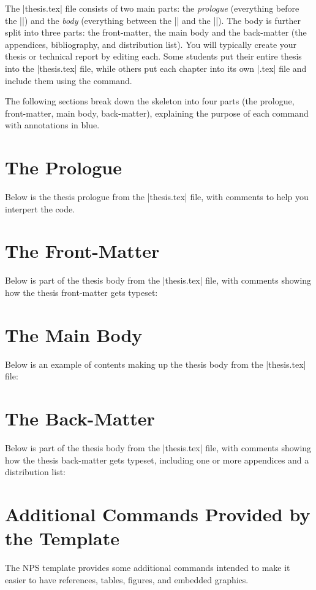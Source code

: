 The |thesis.tex| file consists of two main parts: the
\emph{prologue} (everything before the ||) and the
\emph{body} (everything between the || and the
||). The body is further split into three parts: the front-matter,
the main body and the back-matter (the appendices, bibliography, and
distribution list). You will typically create your thesis or technical
report by editing
each. Some students put their entire thesis into the |thesis.tex|
file, while others put each chapter into its own |.tex| file and
include them using the \verb|| command.

The following sections 
break down the skeleton into four parts (the prologue, front-matter, main body, back-matter), 
explaining the purpose of each command with annotations in blue.


\section{The Prologue}\label{sec:prologue}
Below is the thesis prologue from the |thesis.tex| file, with comments to help you interpert the code.



\section{The Front-Matter}\label{sec:front}
Below is part of the thesis body from the |thesis.tex| file, with comments showing how
the thesis front-matter gets typeset:



\section{The Main Body}\label{sec:main}
Below is an example of contents making up the thesis body from 
the |thesis.tex| file:



\section{The Back-Matter}\label{sec:back}
Below is part of the thesis body from the |thesis.tex| file, with comments showing how
the thesis back-matter gets typeset, including
one or more appendices and a distribution list:




\section{Additional Commands Provided by the Template}
The NPS template provides some additional
commands intended to make it easier to have references, tables,
figures, and embedded graphics.


